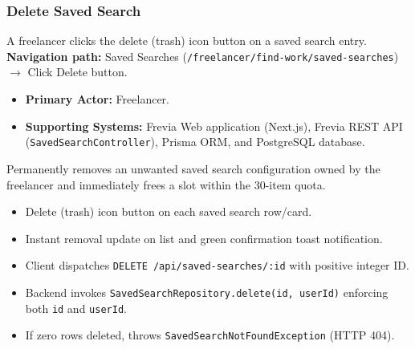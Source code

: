 \subsubsection{Delete Saved Search}

A freelancer clicks the delete (trash) icon button on a saved search entry.\newline
\textbf{Navigation path:} Saved Searches (\texttt{/freelancer/find-work/saved-searches}) $\rightarrow$ Click Delete button.


\begin{itemize}[leftmargin=1.6em,topsep=3pt,itemsep=2pt,parsep=0pt,label=$\bullet$]
    \item \textbf{Primary Actor:} Freelancer.
    \item \textbf{Supporting Systems:} Frevia Web application (Next.js), Frevia REST API (\texttt{SavedSearchController}), Prisma ORM, and PostgreSQL database.
\end{itemize}

\noindent Permanently removes an unwanted saved search configuration owned by the freelancer and immediately frees a slot within the 30-item quota.

\begin{itemize}[leftmargin=1.6em,topsep=3pt,itemsep=2pt,parsep=0pt,label=$\bullet$]
    \item Delete (trash) icon button on each saved search row/card.
    \item Instant removal update on list and green confirmation toast notification.
\end{itemize}

\begin{itemize}[leftmargin=1.6em,topsep=3pt,itemsep=2pt,parsep=0pt,label=$\bullet$]
    \item Client dispatches \texttt{DELETE /api/saved-searches/:id} with positive integer ID.
    \item Backend invokes \texttt{SavedSearchRepository.delete(id, userId)} enforcing both \texttt{id} and \texttt{userId}.
    \item If zero rows deleted, throws \texttt{SavedSearchNotFoundException} (HTTP 404).
\end{itemize}


